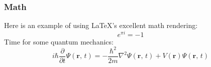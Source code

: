\documentclass[t,english]{beamer}
\begin{document}
\begin{frame}[fragile]
\frametitle{Math}


Here is an example of using LaTeX's excellent math rendering:
\begin{equation}
e^{\pi i} = -1
\end{equation}
Time for some quantum mechanics:
\begin{equation}
i\hbar\frac{\partial}{\partial t} \Psi(\mathbf{r},\,t) = -\frac{\hbar^2}{2m}\nabla^2\Psi(\mathbf{r},\,t) + V(\mathbf{r})\Psi(\mathbf{r},\,t)
\end{equation}
\end{frame}
\end{document}
